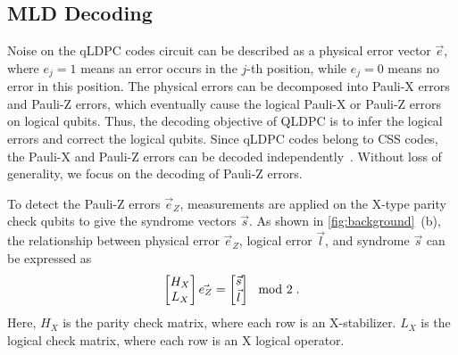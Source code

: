 \subsection{MLD Decoding}
Noise on the qLDPC codes circuit can be described as a physical error vector $\vec{e}$, where $e_j=1$ means an error occurs in the $j$-th position, while $e_j=0$ means no error in this position.
The physical errors can be decomposed into Pauli-X errors and Pauli-Z errors, which eventually cause the logical Pauli-X or Pauli-Z errors on logical qubits. Thus, the decoding objective of QLDPC is to infer the logical errors and correct the logical qubits. Since qLDPC codes belong to CSS codes, the Pauli-X and Pauli-Z errors can be decoded independently~\cite{bposd}. Without loss of generality, we focus on the decoding of Pauli-Z errors.

To detect the Pauli-Z errors $\vec{e}_Z$, measurements are applied on the X-type parity check qubits to give the syndrome vectors $\vec{s}$. 
As shown in \autoref{fig:background}~(b), the relationship between physical error $\vec{e}_Z$, logical error $\vec{l}$, and syndrome $\vec{s}$ can be expressed as
\begin{equation}\small\label{eq:decodingrelation}
    \begin{bmatrix} 
H_X \\ L_X
\end{bmatrix} \vec{e_Z} = \begin{bmatrix}
\vec{s} \\ \vec{l}
\end{bmatrix} \mod 2 \;.
\end{equation}
Here, $H_X$ is the parity check matrix, where each row is an X-stabilizer. $L_X$ is the logical check matrix, where each row is an X logical operator. 

